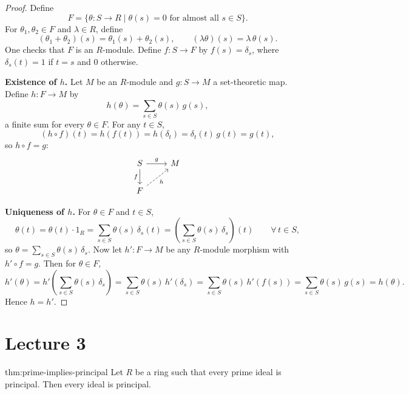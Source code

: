 \begin{proof}
Define
\[
F = \{ \theta: S \to R \mid \theta(s) = 0 \text{ for almost all } s \in S \}.
\]
For $\theta_1, \theta_2 \in F$ and $\lambda \in R$, define
\[
(\theta_1 + \theta_2)(s) = \theta_1(s) + \theta_2(s), \qquad (\lambda \theta)(s) = \lambda\, \theta(s).
\]
One checks that $F$ is an $R$-module. Define $f: S \to F$ by $f(s) = \delta_s$, where $\delta_s(t) = 1$ if $t = s$ and $0$ otherwise.

\textbf{Existence of $h$.} Let $M$ be an $R$-module and $g: S \to M$ a set-theoretic map. Define $h: F \to M$ by
\[
h(\theta) = \sum_{s \in S} \theta(s)\, g(s),
\]
a finite sum for every $\theta \in F$. For any $t \in S$,
\[
(h \circ f)(t) = h(f(t)) = h(\delta_t) = \delta_t(t)\, g(t) = g(t),
\]
so $h \circ f = g$:
\[
\begin{tikzcd}
S \arrow[r, "g"] \arrow[d, "f"'] & M \\
F \arrow[ur, dashed, "h"'] &
\end{tikzcd}
\]

\textbf{Uniqueness of $h$.} For $\theta \in F$ and $t \in S$,
\[
\theta(t) = \theta(t) \cdot 1_R = \sum_{s \in S} \theta(s)\, \delta_s(t) = \left( \sum_{s \in S} \theta(s)\, \delta_s \right)(t) \qquad \forall\, t \in S,
\]
so $\theta = \sum_{s \in S} \theta(s)\, \delta_s$. Now let $h': F \to M$ be any $R$-module morphism with $h' \circ f = g$. Then for $\theta \in F$,
\[
h'(\theta) = h'\left( \sum_{s \in S} \theta(s)\, \delta_s \right) = \sum_{s \in S} \theta(s)\, h'(\delta_s) = \sum_{s \in S} \theta(s)\, h'(f(s)) = \sum_{s \in S} \theta(s)\, g(s) = h(\theta).
\]
Hence $h = h'$.
\end{proof}

\section{Lecture 3}

\begin{theorem}{}{thm:prime-implies-principal}
Let $R$ be a ring such that every prime ideal is principal. Then every ideal is principal.
\end{theorem}

